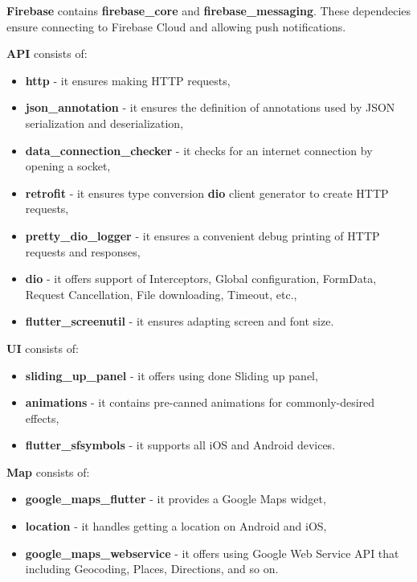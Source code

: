 \textbf{Firebase} contains \textbf{firebase\_core} and \textbf{firebase\_messaging}.
These dependecies ensure connecting to Firebase Cloud and allowing push notifications.

\textbf{API} consists of:
\begin{itemize}
    \item \textbf{http} - it ensures making HTTP requests,
    \item \textbf{json\_annotation} - it ensures the definition of annotations used by JSON serialization and deserialization,
    \item \textbf{data\_connection\_checker} - it checks for an internet connection by opening a socket,
    \item \textbf{retrofit} - it ensures type conversion \textbf{dio} client generator to create HTTP requests,
    \item \textbf{pretty\_dio\_logger} - it ensures a convenient debug printing of HTTP requests and responses,
    \item \textbf{dio} - it offers support of Interceptors, Global configuration, FormData, Request Cancellation, File downloading, Timeout, etc.,
    \item \textbf{flutter\_screenutil} - it ensures adapting screen and font size.
\end{itemize}

\textbf{UI} consists of:
\begin{itemize}
    \item \textbf{sliding\_up\_panel} - it offers using done Sliding up panel,
    \item \textbf{animations} - it contains pre-canned animations for commonly-desired effects,
    \item \textbf{flutter\_sfsymbols} - it supports all iOS and Android devices.
\end{itemize}

\textbf{Map} consists of:
\begin{itemize}
    \item \textbf{google\_maps\_flutter} - it provides a Google Maps widget,
    \item \textbf{location} - it handles getting a location on Android and iOS,
    \item \textbf{google\_maps\_webservice} - it offers using Google Web Service API that including Geocoding, Places, Directions, and so on.
\end{itemize}

